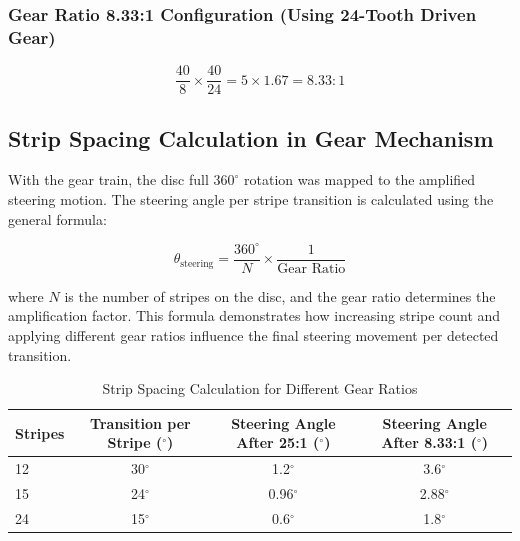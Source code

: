 \subsubsection{Gear Ratio 8.33:1 Configuration (Using 24-Tooth Driven Gear)}

\[
\frac{40}{8} \times \frac{40}{24} = 5 \times 1.67 = 8.33:1
\]


\subsection{Strip Spacing Calculation in Gear Mechanism}
With the gear train, the disc full \( 360^\circ \) rotation was mapped to the amplified steering motion. The steering angle per stripe transition is calculated using the general formula:

\[
\theta_{\text{steering}} = \frac{360^\circ}{N} \times \frac{1}{\text{Gear Ratio}}
\]

where \( N \) is the number of stripes on the disc, and the gear ratio determines the amplification factor. This formula demonstrates how increasing stripe count and applying different gear ratios influence the final steering movement per detected transition.


\begin{table}[h]
    \centering
    \caption{Strip Spacing Calculation for Different Gear Ratios}
    \begin{tabular}{lccc}
        \toprule
        Stripes & Transition per Stripe (\(^\circ\)) & Steering Angle After 25:1 (\(^\circ\)) & Steering Angle After 8.33:1 (\(^\circ\)) \\
        \midrule
        12      & 30\(^\circ\)                      & 1.2\(^\circ\)                         & 3.6\(^\circ\)                         \\
        15      & 24\(^\circ\)                      & 0.96\(^\circ\)                        & 2.88\(^\circ\)                        \\
        24      & 15\(^\circ\)                      & 0.6\(^\circ\)                         & 1.8\(^\circ\)                         \\
        \bottomrule
    \end{tabular}
\end{table}



